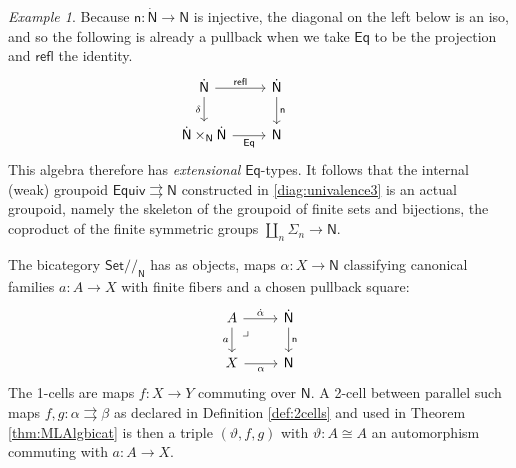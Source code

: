 \documentclass[12pt,reqno]{amsart}
\newcommand{\N}{\ensuremath{\mathbb{N}}}
\newcommand{\Set}{\ensuremath{\mathsf{Set}}}
\renewcommand{\to}{\ensuremath{\rightarrow}}
\newcommand{\tto}{\ensuremath{\rightrightarrows}}
\newcommand{\refl}{\mathsf{refl}}
\newcommand{\n}{\ensuremath{\mathsf{n}}}
\renewcommand{\N}{\ensuremath{\mathsf{N}}}
\newcommand{\NN}{\ensuremath{\dot{\mathsf{N}}}}
\newcommand{\pbcorner}{\arrow[dr,phantom,"\lrcorner" very near start, shift right=.5ex]} %
\theoremstyle{remark}
\newtheorem{example}[theorem]{Example}
\theoremstyle{definition}
\begin{document}
\begin{example}
Because $\n : \NN \to \N$ is injective, the diagonal on the left below is an iso, and so the following is already a pullback when we take $\mathsf{Eq}$ to be the projection and $\refl$ the identity.
 \begin{equation*}\label{diag:EqtypesN}
\begin{tikzcd}
	\NN \ar[r,"\refl"] \ar[d,swap,"\delta"] &  \NN \ar[d, "\n"]\\  
	\NN \times_\N \NN \ar[r, swap,"\mathsf{Eq}"] & \N
 \end{tikzcd}\qquad \qquad 
 \end{equation*}
This algebra therefore has \emph{extensional} $\mathsf{Eq}$-types. 
It follows that the internal (weak) groupoid $\mathsf{Equiv} \tto \N$ constructed in \eqref{diag:univalence3} is an actual groupoid, namely the skeleton of the groupoid of finite sets and bijections, the coproduct of the finite symmetric groups $\coprod_n\Sigma_n\to\N$. 

The bicategory $\Set/\!/_\N$ has as objects, maps $\alpha: X\to \N$ classifying canonical families  $a :A \to X$ with finite fibers and a chosen pullback square:
\begin{equation}\label{eq:classifiedfamiliesN}
\begin{tikzcd}
	 A \ar[d, swap, "a"] \pbcorner \ar[r, "\dot{\alpha}"] & \NN \ar[d, "\n"] \\  
	X \ar[r, swap, "\alpha"] & \N 
 \end{tikzcd}
 \end{equation}
 The 1-cells are maps $f : X\to Y$ commuting over $\N$.  A 2-cell between parallel such maps $f, g : \alpha \tto \beta$ as declared in Definition \ref{def:2cells} and used in Theorem \ref{thm:MLAlgbicat} is then a triple $(\vartheta, f, g)$ with $\vartheta : A \cong A$ an automorphism commuting with $a : A \to X$. 


\end{example}
\end{document}

